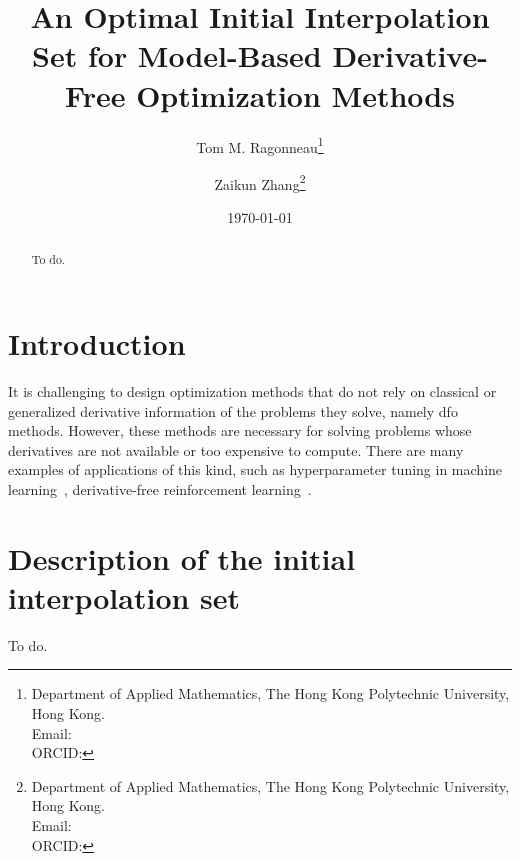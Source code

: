\documentclass[draft]{article}
\title{An Optimal Initial Interpolation Set for Model-Based Derivative-Free Optimization Methods}
\author{
    Tom M. Ragonneau\thanks{
        Department of Applied Mathematics, The Hong Kong Polytechnic University, Hong Kong.\\
        Email: \email{tom.ragonneau@polyu.edu.hk}\\
        ORCID: \orcid{0000-0003-2717-2876}
    } \and
    Zaikun Zhang\thanks{
        Department of Applied Mathematics, The Hong Kong Polytechnic University, Hong Kong.\\
        Email: \email{zaikun.zhang@polyu.edu.hk}\\
        ORCID: \orcid{0000-0001-8934-8190}
    }
}
\date{\today}
\begin{document}
\maketitle

\begin{abstract}
    To do.
\end{abstract}

\section{Introduction}

It is challenging to design optimization methods that do not rely on classical or generalized derivative information of the problems they solve, namely \gls{dfo} methods.
However, these methods are necessary for solving problems whose derivatives are not available or too expensive to compute.
There are many examples of applications of this kind, such as hyperparameter tuning in machine learning~\cite{Ghanbari_Scheinberg_2017}, derivative-free reinforcement learning~\cite{Qian_Yu_2021}.

\section{Description of the initial interpolation set}

To do.




\listoftodos
\end{document}

